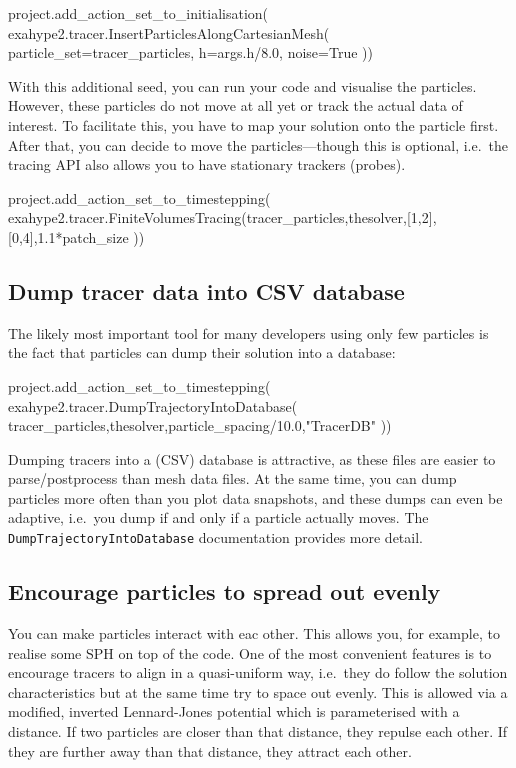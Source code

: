 \begin{code}
project.add_action_set_to_initialisation( 
 exahype2.tracer.InsertParticlesAlongCartesianMesh( 
  particle_set=tracer_particles,
  h=args.h/8.0, noise=True 
))
\end{code}



\noindent
With this additional seed, you can run your code and visualise the particles. 
However, these particles do not move at all yet or track the actual data of
interest.
To facilitate this, you have to map your solution onto the particle first.
After that, you can decide to move the particles---though this is optional,
i.e.~the tracing API also allows you to have stationary trackers (probes).


\begin{code}
project.add_action_set_to_timestepping(
 exahype2.tracer.FiniteVolumesTracing(tracer_particles,thesolver,[1,2],[0,4],1.1*patch_size
))
\end{code}


\subsection{Dump tracer data into CSV database}

The likely most important tool for many developers using only few particles is
the fact that particles can dump their solution into a database:

\begin{code}
project.add_action_set_to_timestepping( 
 exahype2.tracer.DumpTrajectoryIntoDatabase(
  tracer_particles,thesolver,particle_spacing/10.0,"TracerDB"
))
\end{code}

\noindent
Dumping tracers into a (CSV) database is attractive, as these files are easier
to parse/postprocess than mesh data files. 
At the same time, you can dump particles more often than you plot data
snapshots, and these dumps can even be adaptive, i.e.~you dump if and only if a
particle actually moves.
The \texttt{DumpTrajectoryIntoDatabase} documentation provides more detail.


\subsection{Encourage particles to spread out evenly}

You can make particles interact with eac other. 
This allows you, for example, to
realise some SPH on top of the code.
One of the most convenient features is to encourage tracers to align in a
quasi-uniform way, i.e.~they do follow the solution characteristics but at the
same time try to space out evenly.
This is allowed via a modified, inverted Lennard-Jones potential
which is parameterised with a distance.
If two particles are closer than that distance, they repulse each other. 
If they are further away than that distance, they attract each other.

